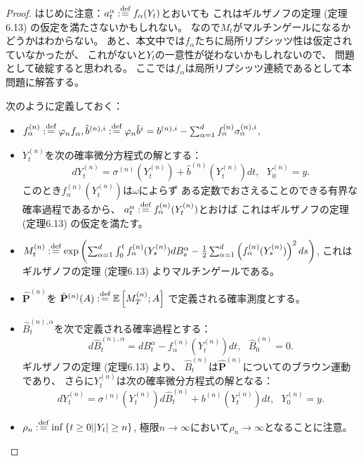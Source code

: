 \documentclass[uplatex]{jsarticle}
\theoremstyle{definition}
\def\P{\mathbf{P}}
\def\E{\mathbb{E}}
\def\dfn{:\overset{\mbox{{\scriptsize def}}}{=}}
\begin{document}
\begin{proof}
  はじめに注意：\(a_t^\alpha \dfn f_\alpha(Y_t)\)とおいても
  これはギルザノフの定理 (定理6.13) の仮定を満たさないかもしれない。
  なので\(M_t\)がマルチンゲールになるかどうかはわからない。
  あと、本文中では\(f_\alpha\)たちに局所リプシッツ性は仮定されていなかったが、
  これがないと\(Y_t\)の一意性が従わないかもしれないので、
  問題として破綻すると思われる。
  ここでは\(f_\alpha\)は局所リプシッツ連続であるとして本問題に解答する。

  次のように定義しておく：
  \begin{itemize}
    \item
    \(f_\alpha^{(n)}\dfn \varphi_n f_\alpha,
    \hat{b}^{(n),i} \dfn \varphi_n\hat{b}^i
    = b^{(n),i} - \sum_{\alpha=1}^d f_\alpha^{(n)}\sigma_{\alpha}^{(n),i}\),
    \item
    \(Y_t^{(n)}\)を次の確率微分方程式の解とする：
    \[
    dY_t^{(n)} = \sigma^{(n)}(Y_t^{(n)}) + \hat{b}^{(n)}(Y_t^{(n)})dt,
    \ \ \ Y_0^{(n)} = y.
    \]
    このとき\(f_\alpha^{(n)}(Y_t^{(n)})\)は\(\omega\)によらず
    ある定数でおさえることのできる有界な確率過程であるから、
    \(a_t^\alpha \dfn f_\alpha^{(n)}(Y_t^{(n)})\)とおけば
    これはギルザノフの定理 (定理6.13) の仮定を満たす。
    \item
    \(M_t^{(n)} \dfn \exp\left(
    \sum_{\alpha=1}^d\int_0^t f_\alpha^{(n)}(Y_s^{(n)})dB_s^\alpha
    - \frac{1}{2}\sum_{\alpha = 1}^d \left( f_\alpha^{(n)}(Y_s^{(n)})\right)^2 ds
    \right)\),
    これはギルザノフの定理 (定理6.13) よりマルチンゲールである。
    \item
    \(\hat{\P}^{(n)}\)を
    \(\hat{\P}^{(n)}(A) \dfn \E\left[ M_T^{(n)}; A\right]\)
    で定義される確率測度とする。
    \item
    \(\hat{B}_t^{(n),\alpha}\)を次で定義される確率過程とする：
    \[
    d\hat{B}_t^{(n),\alpha} = dB_t^\alpha - f_\alpha^{(n)}(Y_t^{(n)})dt,
    \ \ \ \hat{B}_0^{(n)} = 0.
    \]
    ギルザノフの定理 (定理6.13) より、
    \(\hat{B}_t^{(n)}\)は\(\hat{\P}^{(n)}\)についてのブラウン運動であり、
    さらに\(Y_t^{(n)}\)は次の確率微分方程式の解となる：
    \[
    dY_t^{(n)} = \sigma^{(n)}(Y_t^{(n)}) d\hat{B}_t^{(n)} + b^{(n)}(Y_t^{(n)})dt,
    \ \ \ Y_0^{(n)} = y.
    \]
    \item
    \(\rho_n \dfn \inf\left\{ t\geq 0 \middle| |Y_t| \geq n \right\}\),
    極限\(n\to \infty\)において\(\rho_n \to \infty\)となることに注意。
  \end{itemize}


\end{proof}
\end{document}
